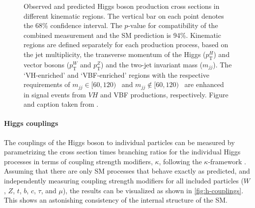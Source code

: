 \begin{figure}
  \caption{Observed and predicted Higgs boson production cross sections in different
  kinematic regions. The vertical bar on each point denotes the 68\% confidence interval. The $p$-value for compatibility of the combined measurement and the SM prediction is 94\%. Kinematic regions are defined separately for each production process, based on the jet multiplicity, the transverse momentum of the Higgs ($p_{\textrm{T}}^H$) and vector bosons ($p_{\textrm{T}}^W$ and $p_{\textrm{T}}^Z$) and the two-jet invariant mass ($m_{jj}$).
The `VH-enriched' and `VBF-enriched' regions with the respective requirements of $m_{jj}\in[60, 120)$ \GeV\ and $m_{jj}\notin[60,120)$ \GeV\ are enhanced in signal events from $VH$ and VBF productions, respectively. Figure and caption taken from .
  }
  \label{fig:stxs-stage12}
\end{figure}


\paragraph{Higgs couplings}
The couplings of the Higgs boson to individual particles can be measured by parametrizing the cross section times branching ratios for the individual Higgs processes in terms of coupling strength modifiers, $\kappa$, following the $\kappa$-framework \cite{LHCHandbookV3}. 
Assuming that there are only SM processes that behave exactly as predicted, and independently measuring coupling strength modifiers for all included particles ($W$, $Z$, $t$, $b$, $c$, $\tau$, and $\mu$), the results can be visualized as shown in \cref{fig:h-couplings}. 
This shows an astonishing consistency of the internal structure of the SM. 


